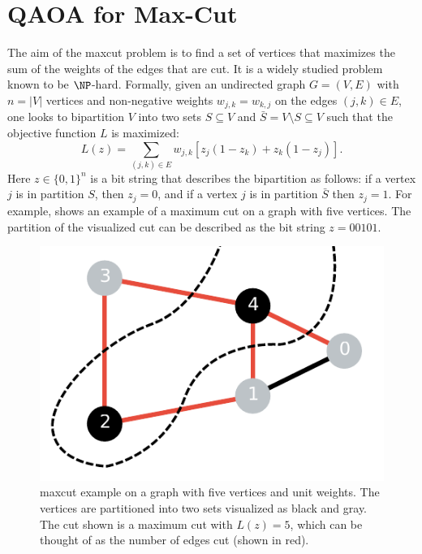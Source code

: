 \chapter{QAOA for Max-Cut} \label{chap:qaoa-maxcut}
The aim of the \gls{maxcut} problem is to find a set of vertices that maximizes the sum of the weights of the edges that are cut.
It is a widely studied problem known to be $\NP$-hard.
Formally, given an undirected graph $G = (V, E)$ with $n = |V|$ vertices and non-negative weights $w_{j, k} = w_{k, j}$ on the edges $(j, k) \in E$, one looks to bipartition $V$ into two sets $S \subseteq V$ and $\bar{S} = V \setminus S \subseteq V$ such that the objective function $L$ is maximized:
\begin{equation} \label{eqn:max-cut-objective}
L(z) = \sum_{(j, k) \in E} w_{j, k}\left[z_j\left(1 - z_k\right) + z_k(1 - z_j)\right].
\end{equation}
Here $z \in \{0, 1\}^n$ is a bit string that describes the bipartition as follows: if a vertex $j$ is in partition $S$, then $z_j = 0$, and if a vertex $j$ is in partition $\bar{S}$ then $z_j = 1$.
For example,  shows an example of a maximum cut on a graph with five vertices.
The partition of the visualized cut can be described as the bit string $z = 00101$.
\begin{figure}[ht]
    \centering
    \includegraphics[width=0.4\linewidth]{figures/maxcut_5_graph_cut_example.pdf}
    \caption[\Gls{maxcut} example on a graph with five vertices and unit weights.]{
        \Gls{maxcut} example on a graph with five vertices and unit weights.
        The vertices are partitioned into two sets visualized as black and gray.
        The cut shown is a maximum cut with $L(z) = 5$, which can be thought of as the number of edges cut (shown in red).
    }
    \label{fig:maxcut-5-example}
\end{figure}

